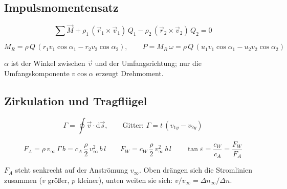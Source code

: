 \documentclass[11pt,a4paper]{article}
\newcommand{\dd}{\mathrm{d}}
\begin{document}
\subsection{Impulsmomentensatz}

\[
\sum\vec M + \rho_1\,(\vec r_1\times\vec v_1)\,Q_1 - \rho_2\,(\vec r_2\times\vec v_2)\,Q_2 = 0
\]
\begin{formel}[title={Euler'sche Turbinengleichung (radiales Laufrad, $u = \omega r$)}]
\[
M_R = \rho\,Q\,(r_1 v_1\cos\alpha_1 - r_2 v_2\cos\alpha_2), \qquad
P = M_R\,\omega = \rho\,Q\,(u_1 v_1\cos\alpha_1 - u_2 v_2\cos\alpha_2)
\]
\end{formel}
$\alpha$ ist der Winkel zwischen $\vec v$ und der Umfangsrichtung; nur die Umfangskomponente $v\cos\alpha$ erzeugt Drehmoment.

\subsection{Zirkulation und Tragflügel}

\[
\Gamma = \oint \vec v\cdot\dd\vec s, \qquad \text{Gitter: } \Gamma = t\,(v_{1y} - v_{2y})
\]
\begin{formel}[title={Auftrieb (Kutta-Joukowski) und Beiwerte}]
\[
F_A = \rho\,v_\infty\,\Gamma\,b = c_A\,\frac{\rho}{2}\,v_\infty^2\,b\,l
\qquad
F_W = c_W\,\frac{\rho}{2}\,v_\infty^2\,b\,l
\qquad
\tan\varepsilon = \frac{c_W}{c_A} = \frac{F_W}{F_A}
\]
\end{formel}
$F_A$ steht senkrecht auf der Anströmung $v_\infty$. Oben drängen sich die Stromlinien zusammen ($v$ größer, $p$ kleiner), unten weiten sie sich: $v/v_\infty = \Delta n_\infty/\Delta n$.
\end{document}
